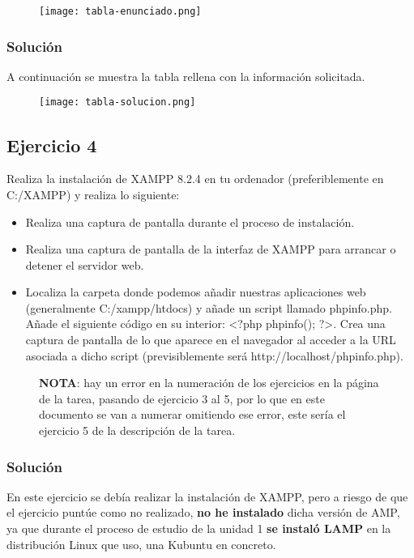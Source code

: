     \begin{figure}[H]
    \centering
    \texttt{[image: tabla-enunciado.png]}
\end{figure}

\subsubsection{Solución}
A continuación se muestra la tabla rellena con la información solicitada.

\begin{figure}[H]
    \centering
    \texttt{[image: tabla-solucion.png]}
\end{figure}

\subsection{Ejercicio 4}
Realiza la instalación de XAMPP 8.2.4 en tu ordenador (preferiblemente en C:/XAMPP) y realiza lo siguiente:

\begin{itemize}
    \item Realiza una captura de pantalla durante el proceso de instalación.
    \item Realiza una captura de pantalla de la interfaz de XAMPP para arrancar o detener el servidor web.
    \item Localiza la carpeta donde podemos añadir nuestras aplicaciones web (generalmente C:/xampp/htdocs) y añade un script llamado phpinfo.php. Añade el siguiente código en su interior: <?php phpinfo(); ?>. Crea una captura de pantalla de lo que aparece en el navegador al acceder a la URL asociada a dicho script (previsiblemente será http://localhost/phpinfo.php).
\end{itemize}

\begin{figure}[H]
    \begin{tcolorbox}[sharp corners, colback=yellow!30, colframe=white!20]
\textbf{NOTA}: hay un error en la numeración de los ejercicios en la página de la tarea, pasando de ejercicio 3 al 5, por lo que en este documento se van a numerar omitiendo ese error, este sería el ejercicio 5 de la descripción de la tarea.
    \end{tcolorbox}
\end{figure}

\subsubsection{Solución}
En este ejercicio se debía realizar la instalación de XAMPP, pero a riesgo de que el ejercicio puntúe como no realizado, \textbf{no he instalado} dicha versión de AMP, ya que durante el proceso de estudio de la unidad 1 \textbf{se instaló LAMP} en la distribución Linux que uso, una Kubuntu en concreto.

